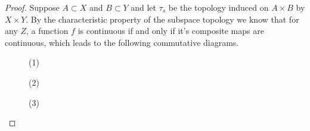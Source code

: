 \documentclass[minion]{homework651}
\begin{document}
\begin{problems}
\begin{proof} Suppose $A\subset X$ and $B\subset Y$ and let $\tau_s$ be the topology induced on $A\times B$
    by $X \times Y$. By the characteristic property of the subspace topology we know that for any $Z$, 
    a function $f$ is continuous if and only if it's composite maps are continuous, which leads to the following commutative diagrams. 
\begin{figure}[!h]
    \begin{minipage}[c]{.32\linewidth}
        \centering
    \caption{(1)}
    \end{minipage} \hfill
    \begin{minipage}[c]{.32\linewidth}
        \centering
        \caption{(2)}
    \end{minipage} \hfill
    \begin{minipage}[c]{.32\linewidth}
        \centering
        \caption{(3)}
    \end{minipage}             
\end{figure}


\end{proof}
\end{problems}
\end{document}

